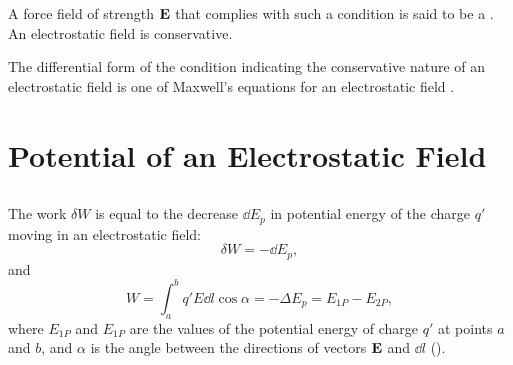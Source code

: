 A force field of strength $\vb{E}$ that complies with such a condition is said to be a . An electrostatic field is conservative.

The differential form of the condition indicating the conservative nature of an electrostatic field is one of Maxwell's equations for an electrostatic field .


\section[Electrostatic Field Potential]{Potential of an Electrostatic Field}
\label{sec-16.2}

\subsection{}\label{16.2.1} The work $\delta W$  is equal to the decrease $\dd E_{p}$ in potential energy  of the charge $q'$ moving in an electrostatic field:
\begin{equation*}%
\delta W = - \dd E_{p},
\end{equation*}
and
\begin{equation*}%
W = \int_{a}^{b} q' E \dd l \cos \alpha =- \Delta E_{p} = E_{1P} - E_{2P},
\end{equation*}
where $E_{1P}$ and $E_{1P}$ are the values of the potential energy of
charge $q'$ at points $a$ and $b$, and $\alpha$ is the angle between the directions of vectors $\vb{E}$ and $\dd l$ ().

